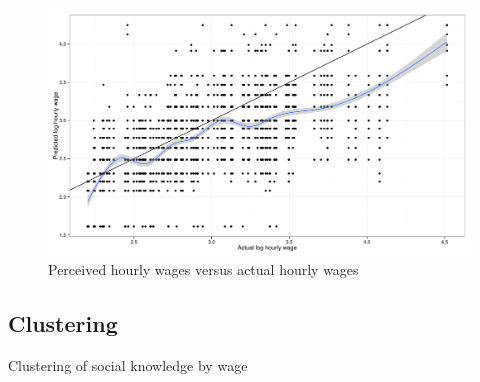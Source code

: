\documentclass[11pt]{article}
\begin{document}
\begin{figure}
\caption{Perceived hourly wages versus actual hourly wages \label{fig:prediction_scatter}} 
\centering 
\includegraphics[width = \linewidth]{./plots/prediction_scatter.pdf} 
\end{figure} 

\subsection{Clustering} 

\begin{table}
\centering 
\caption{Clustering of social knowledge by wage}
 
\end{table} 
\end{document}
